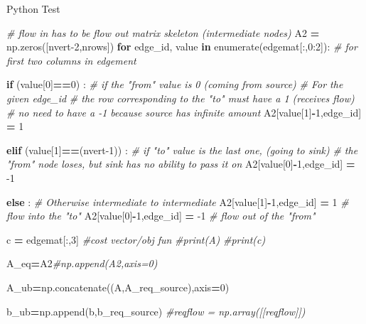 \documentclass[
  ignorenonframetext,
]{beamer}
\newenvironment{Shaded}{\begin{snugshade}}{\end{snugshade}}
\newcommand{\BuiltInTok}[1]{#1}
\newcommand{\CommentTok}[1]{\textcolor[rgb]{0.56,0.35,0.01}{\textit{#1}}}
\newcommand{\ControlFlowTok}[1]{\textcolor[rgb]{0.13,0.29,0.53}{\textbf{#1}}}
\newcommand{\DecValTok}[1]{\textcolor[rgb]{0.00,0.00,0.81}{#1}}
\newcommand{\KeywordTok}[1]{\textcolor[rgb]{0.13,0.29,0.53}{\textbf{#1}}}
\newcommand{\NormalTok}[1]{#1}
\newcommand{\OperatorTok}[1]{\textcolor[rgb]{0.81,0.36,0.00}{\textbf{#1}}}
\begin{document}
\begin{frame}[fragile]{Python Test}
\begin{Shaded}
\begin{Highlighting}[]
  \CommentTok{# flow in has to be flow out matrix skeleton (intermediate nodes)}
\NormalTok{  A2 }\OperatorTok{=}\NormalTok{ np.zeros([nvert}\DecValTok{-2}\NormalTok{,nrows])}
  \ControlFlowTok{for}\NormalTok{ edge_id, value }\KeywordTok{in} \BuiltInTok{enumerate}\NormalTok{(edgemat[:,}\DecValTok{0}\NormalTok{:}\DecValTok{2}\NormalTok{]): }\CommentTok{# for first two columns in edgement}
  
    \ControlFlowTok{if}\NormalTok{ (value[}\DecValTok{0}\NormalTok{]}\OperatorTok{==}\DecValTok{0}\NormalTok{) : }\CommentTok{# if the "from" value is 0 (coming from source)}
      \CommentTok{# For the given edge_id}
      \CommentTok{# the row corresponding to the "to" must have a 1 (receives flow) }
      \CommentTok{# no need to have a -1 because source has infinite amount}
\NormalTok{      A2[value[}\DecValTok{1}\NormalTok{]}\OperatorTok{-}\DecValTok{1}\NormalTok{,edge_id] }\OperatorTok{=} \DecValTok{1} 
      
    \ControlFlowTok{elif}\NormalTok{ (value[}\DecValTok{1}\NormalTok{]}\OperatorTok{==}\NormalTok{(nvert}\DecValTok{-1}\NormalTok{)) : }\CommentTok{# if "to" value is the last one, (going to sink) }
      \CommentTok{# the "from" node loses, but sink has no ability to pass it on}
\NormalTok{      A2[value[}\DecValTok{0}\NormalTok{]}\OperatorTok{-}\DecValTok{1}\NormalTok{,edge_id] }\OperatorTok{=} \DecValTok{-1}
    
    
    \ControlFlowTok{else}\NormalTok{ : }\CommentTok{# Otherwise intermediate to intermediate}
\NormalTok{      A2[value[}\DecValTok{1}\NormalTok{]}\OperatorTok{-}\DecValTok{1}\NormalTok{,edge_id] }\OperatorTok{=} \DecValTok{1} \CommentTok{# flow into the "to"}
\NormalTok{      A2[value[}\DecValTok{0}\NormalTok{]}\OperatorTok{-}\DecValTok{1}\NormalTok{,edge_id] }\OperatorTok{=} \DecValTok{-1} \CommentTok{# flow out of the "from"}
      
\NormalTok{  c }\OperatorTok{=}\NormalTok{ edgemat[:,}\DecValTok{3}\NormalTok{] }\CommentTok{#cost vector/obj fun}
  \CommentTok{#print(A)}
  \CommentTok{#print(c)}
  
\NormalTok{  A_eq}\OperatorTok{=}\NormalTok{A2}\CommentTok{#np.append(A2,axis=0)}
  
\NormalTok{  A_ub}\OperatorTok{=}\NormalTok{np.concatenate((A,A_req_source),axis}\OperatorTok{=}\DecValTok{0}\NormalTok{)}
  
\NormalTok{  b_ub}\OperatorTok{=}\NormalTok{np.append(b,b_req_source)}
  \CommentTok{#reqflow = np.array([[reqflow]])}
  

\end{Highlighting}
\end{Shaded}
\end{frame}
\end{document}
